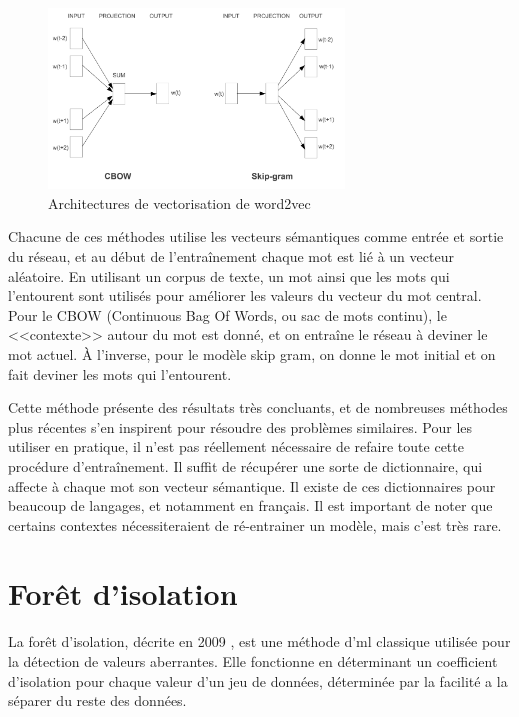 \documentclass[openany, 11pt]{memoir}
\begin{document}
\begin{figure}[ht]
	\centering
	\includegraphics[width=0.7\textwidth]{images/word2vec.png}
	\caption{Architectures de vectorisation de word2vec}
	\label{word2vec}
\end{figure}

Chacune de ces méthodes utilise les vecteurs sémantiques comme entrée et sortie du réseau, et au début de l'entraînement chaque mot est lié à un vecteur aléatoire. En utilisant un corpus de texte, un mot ainsi que les mots qui l'entourent sont utilisés pour améliorer les valeurs du vecteur du mot central. Pour le CBOW (Continuous Bag Of Words, ou sac de mots continu), le <<contexte>> autour du mot est donné, et on entraîne le réseau à deviner le mot actuel. À l'inverse, pour le modèle skip gram, on donne le mot initial et on fait deviner les mots qui l'entourent.

Cette méthode présente des résultats très concluants, et de nombreuses méthodes plus récentes s'en inspirent pour résoudre des problèmes similaires. Pour les utiliser en pratique, il n'est pas réellement nécessaire de refaire toute cette procédure d'entraînement. Il suffit de récupérer une sorte de dictionnaire, qui affecte à chaque mot son vecteur sémantique. Il existe de ces dictionnaires pour beaucoup de langages, et notamment en français. Il est important de noter que certains contextes nécessiteraient de ré-entrainer un modèle, mais c'est très rare.

\section{Forêt d'isolation}

La forêt d'isolation, décrite en 2009 \cite{isolationforest}, est une méthode d'\gls{ml} classique utilisée pour la détection de valeurs aberrantes. Elle fonctionne en déterminant un coefficient d'isolation pour chaque valeur d'un jeu de données, déterminée par la facilité a la séparer du reste des données.
\end{document}
